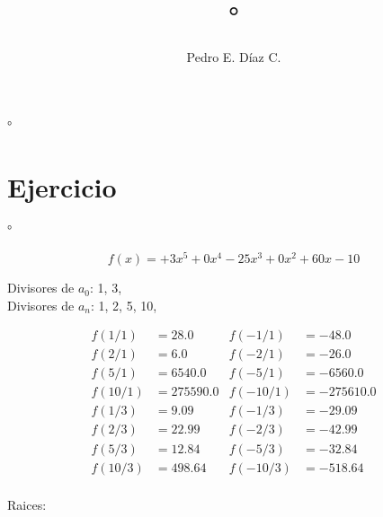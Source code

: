 \documentclass[12pt]{article}
\title{°}
\author{Pedro E. Díaz C.}
\begin{document}
\maketitle

°


	
\section{Ejercicio}
 °

$$f(x)=	+3x^{5}+0x^{4}-25x^{3}+0x^{2}+60x-10$$

Divisores de $a_0$:	1, 3, \\
Divisores de $a_n$:	1, 2, 5, 10, $$

\begin{align*}
	f(1/1)&= 28.0	&	f(-1/1)&= -48.0 \\
	f(2/1)&= 6.0	&	f(-2/1)&= -26.0 \\
	f(5/1)&= 6540.0	&	f(-5/1)&= -6560.0 \\
	f(10/1)&= 275590.0	&	f(-10/1)&= -275610.0 \\
	f(1/3)&= 9.09	&	f(-1/3)&= -29.09 \\
	f(2/3)&= 22.99	&	f(-2/3)&= -42.99 \\
	f(5/3)&= 12.84	&	f(-5/3)&= -32.84 \\
	f(10/3)&= 498.64	&	f(-10/3)&= -518.64 \\
\end{align*}

Raices: 	
	
\end{document}
